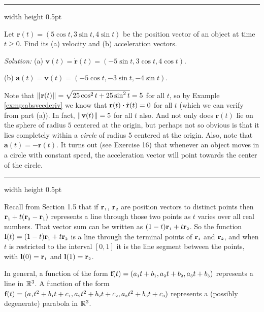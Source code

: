 \vspace{2mm}
\hrule width \textwidth height 0.5pt
\begin{exmp}
 Let $\textbf{r}(t) = (5 \cos t , 3 \sin t , 4 \sin t )$ be the position vector of an object at time $t \ge 0$. Find
 its (a) velocity and (b) acceleration vectors.\vspace{1mm}
 \par\noindent \emph{Solution:} (a) $\textbf{v}(t) = \dot{\textbf{r}}(t) = (-5 \sin t , 3 \cos t ,
 4 \cos t )$.\vspace{1mm}
 \par\noindent (b) $\textbf{a}(t) = \dot{\textbf{v}}(t) = (-5 \cos t , -3 \sin t , -4 \sin t )$.\vspace{1mm}
 
 \par\noindent Note that $\lVert\mspace{1mu}\textbf{r}(t)\mspace{1mu}\rVert = \sqrt{25 \cos^2 t + 25 \sin^2 t} = 5$ for all $t$, so by Example
 \ref{exmp:absvecderiv} we know that $\textbf{r}(t) \bm{\cdot} \dot{\textbf{r}}(t) = 0$ for all $t$ (which we can verify
 from part (a)). In fact, $\lVert\mspace{1mu}\textbf{v}(t)\mspace{1mu}\rVert = 5$ for all $t$ also. And not only does $\textbf{r}(t)$ lie on the
 sphere of radius $5$ centered at the origin, but perhaps not so obvious is that it lies completely within a
 \emph{circle} of radius 5 centered at the origin. Also, note that $\textbf{a}(t) = -\textbf{r}(t)$. It turns out (see
 Exercise 16) that whenever an object moves in a circle with constant speed, the acceleration vector will point towards the center of the circle.
\end{exmp}
\hrule width \textwidth height 0.5pt
\vskip3mm

Recall from Section 1.5 that if $\textbf{r}_{\scriptscriptstyle 1}$, $\textbf{r}_{\scriptscriptstyle 2}$ are position vectors to distinct points
then $\textbf{r}_{\scriptscriptstyle 1} + t (\textbf{r}_{\scriptscriptstyle 2} - \textbf{r}_{\scriptscriptstyle 1})$ represents a line through those two
points as $t$ varies over all real numbers. That vector sum can be written as $(1 - t) \textbf{r}_{\scriptscriptstyle 1} +
t \textbf{r}_{\scriptscriptstyle 2}$. So the function $\textbf{l}(t) = (1 - t) \textbf{r}_{\scriptscriptstyle 1} +
t \textbf{r}_{\scriptscriptstyle 2}$ is a line through the terminal points of $\textbf{r}_{\scriptscriptstyle 1}$ and $\textbf{r}_{\scriptscriptstyle 2}$, and
when $t$ is restricted to the interval $\left[ 0,1 \right]$ it is the line segment between the points, with
$\textbf{l}(0) = \textbf{r}_{\scriptscriptstyle 1}$ and $\textbf{l}(1) = \textbf{r}_{\scriptscriptstyle 2}$.

In general, a function of the form
$\textbf{f}(t) = (a_{\scriptscriptstyle 1}t + b_{\scriptscriptstyle 1},a_{\scriptscriptstyle 2}t + b_{\scriptscriptstyle 2},a_{\scriptscriptstyle 3}t + b_{\scriptscriptstyle 3})$ represents a line
in $\mathbb{R}^{3}$. A function of the form
$\textbf{f}(t) = (a_{\scriptscriptstyle 1}t^2 + b_{\scriptscriptstyle 1}t + c_{\scriptscriptstyle 1},a_{\scriptscriptstyle 2}t^2 + b_{\scriptscriptstyle 2}t + c_{\scriptscriptstyle 2},
a_{\scriptscriptstyle 3}t^2 + b_{\scriptscriptstyle 3}t + c_{\scriptscriptstyle 3})$ represents a (possibly degenerate) parabola in $\mathbb{R}^{3}$.

